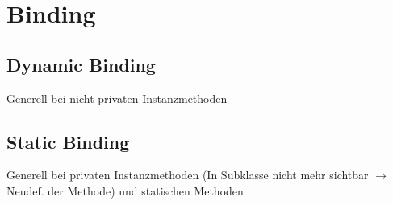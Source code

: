{\section{Binding}
\subsection{Dynamic Binding}
    Generell bei nicht-privaten Instanzmethoden
    \vspace{-0.1cm}

\subsection{Static Binding}
    Generell bei privaten Instanzmethoden (In Subklasse nicht mehr sichtbar $\rightarrow$ Neudef. der Methode) und statischen Methoden
    \vspace{-0.1cm}
}

